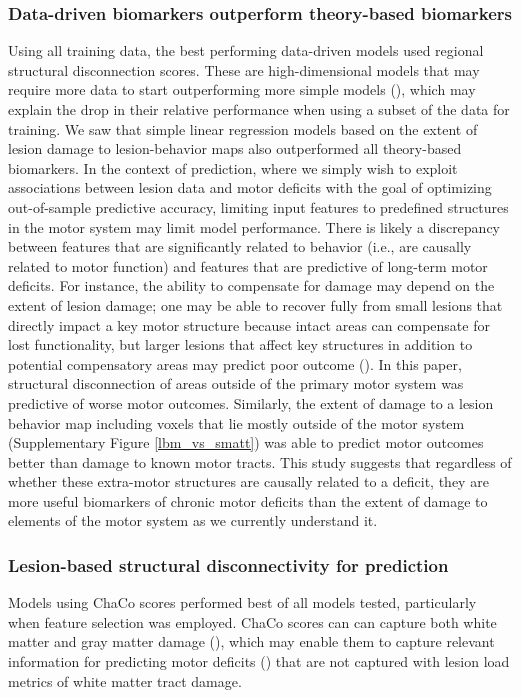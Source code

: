 \documentclass[10pt]{article}
\begin{document}
\subsubsection*{Data-driven biomarkers outperform theory-based biomarkers}
Using all training data, the best performing data-driven models used regional structural disconnection scores. These are high-dimensional models that may require more data to start outperforming more simple models (\cite{Bourached2022-vz}), which may explain the drop in their relative performance when using a subset of the data for training. We saw that simple linear regression models based on the extent of lesion damage to lesion-behavior maps also outperformed all theory-based biomarkers.  In the context of prediction, where we simply wish to exploit associations between lesion data and motor deficits with the goal of optimizing out-of-sample predictive accuracy, limiting input features to predefined structures in the motor system may limit model performance. There is likely a discrepancy between features that are significantly related to behavior (i.e., are causally related to motor function) and features that are predictive of long-term motor deficits. For instance, the ability to compensate for damage may depend on the extent of lesion damage; one may be able to recover fully from small lesions that directly impact a key motor structure because intact areas can compensate for lost functionality, but larger lesions that affect key structures in addition to potential compensatory areas may predict poor outcome (\cite{Di_Pino2014-qa, Sperber2021-lw}). In this paper, structural disconnection of areas outside of the primary motor system was predictive of worse motor outcomes. Similarly, the extent of damage to a lesion behavior map including voxels that lie mostly outside of the motor system (Supplementary Figure \ref{lbm_vs_smatt}) was able to predict motor outcomes better than damage to known motor tracts. This study suggests that regardless of whether these extra-motor structures are causally related to a deficit, they are more useful biomarkers of chronic motor deficits than the extent of damage to elements of the motor system as we currently understand it. 

\subsubsection*{Lesion-based structural disconnectivity for prediction}

Models using ChaCo scores performed best of all models tested, particularly when feature selection was employed. ChaCo scores can can capture both white matter and gray matter damage (\cite{Kuceyeski2013-nk}), which may enable them to capture relevant information for predicting motor deficits (\cite{Park2016-te,Rondina2016-ds}) that are not captured with lesion load metrics of white matter tract damage. 
\end{document}
